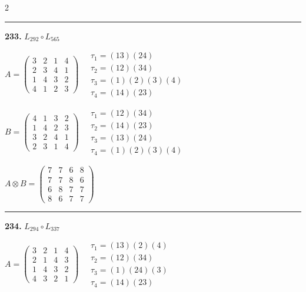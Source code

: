 \begin{multicols}{2}
\vspace{0.3em}
\hrule
\vspace{0.3em}

\noindent\textbf{233.} $L_{292} \circ L_{565}$

$A = \begin{pmatrix} 3 & 2 & 1 & 4 \\ 2 & 3 & 4 & 1 \\ 1 & 4 & 3 & 2 \\ 4 & 1 & 2 & 3 \end{pmatrix} \quad \begin{matrix} \tau_{1}=(1 3)(2 4) \\ \tau_{2}=(1 2)(3 4) \\ \tau_{3}=(1)(2)(3)(4) \\ \tau_{4}=(1 4)(2 3) \end{matrix}$

$B = \begin{pmatrix} 4 & 1 & 3 & 2 \\ 1 & 4 & 2 & 3 \\ 3 & 2 & 4 & 1 \\ 2 & 3 & 1 & 4 \end{pmatrix} \quad \begin{matrix} \tau_{1}=(1 2)(3 4) \\ \tau_{2}=(1 4)(2 3) \\ \tau_{3}=(1 3)(2 4) \\ \tau_{4}=(1)(2)(3)(4) \end{matrix}$

$A \otimes B = \begin{pmatrix} 7 & 7 & 6 & 8 \\ 7 & 7 & 8 & 6 \\ 6 & 8 & 7 & 7 \\ 8 & 6 & 7 & 7 \end{pmatrix}$

\vspace{0.3em}
\hrule
\vspace{0.3em}

\noindent\textbf{234.} $L_{294} \circ L_{337}$

$A = \begin{pmatrix} 3 & 2 & 1 & 4 \\ 2 & 1 & 4 & 3 \\ 1 & 4 & 3 & 2 \\ 4 & 3 & 2 & 1 \end{pmatrix} \quad \begin{matrix} \tau_{1}=(1 3)(2)(4) \\ \tau_{2}=(1 2)(3 4) \\ \tau_{3}=(1)(2 4)(3) \\ \tau_{4}=(1 4)(2 3) \end{matrix}$


\end{multicols}
